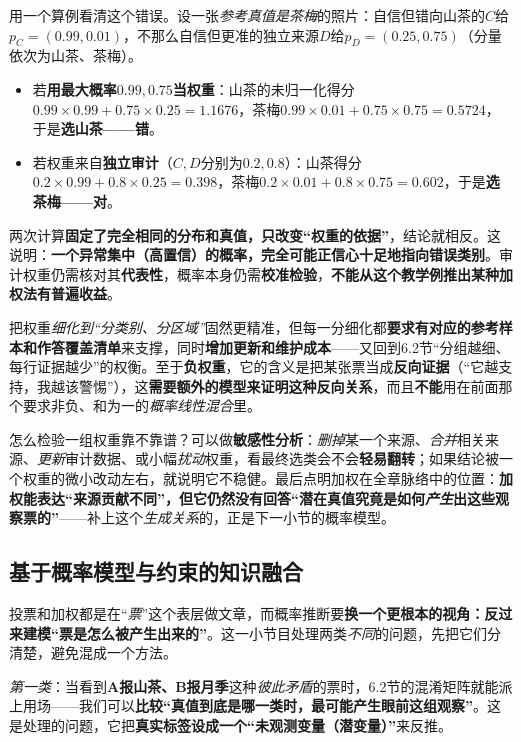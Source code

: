 用一个算例看清这个错误。设一张\emph{参考真值是茶梅}的照片：自信但错向山茶的$C$给$p_C=(0.99,0.01)$，不那么自信但更准的独立来源$D$给$p_D=(0.25,0.75)$（分量依次为山茶、茶梅）。
\begin{itemize}\item 若\textbf{用最大概率}$0.99,0.75$\textbf{当权重}：山茶的未归一化得分$0.99\times0.99+0.75\times0.25=1.1676$，茶梅$0.99\times0.01+0.75\times0.75=0.5724$，于是\textbf{选山茶——错}。\item 若权重来自\textbf{独立审计}（$C,D$分别为$0.2,0.8$）：山茶得分$0.2\times0.99+0.8\times0.25=0.398$，茶梅$0.2\times0.01+0.8\times0.75=0.602$，于是\textbf{选茶梅——对}。\end{itemize}
两次计算\textbf{固定了完全相同的分布和真值，只改变“权重的依据”}，结论就相反。这说明：\textbf{一个异常集中（高置信）的概率，完全可能正信心十足地指向错误类别}。审计权重仍需核对其\textbf{代表性}，概率本身仍需\textbf{校准检验}，\textbf{不能从这个教学例推出某种加权法有普遍收益}。

把权重\emph{细化到“分类别、分区域”}固然更精准，但每一分细化都\textbf{要求有对应的参考样本和作答覆盖清单}来支撑，同时\textbf{增加更新和维护成本}——又回到6.2节“分组越细、每行证据越少”的权衡。至于\textbf{负权重}，它的含义是把某张票当成\textbf{反向证据}（“它越支持，我越该警惕”），这\textbf{需要额外的模型来证明这种反向关系}，而且\textbf{不能}用在前面那个要求非负、和为一的\emph{概率线性混合}里。

怎么检验一组权重靠不靠谱？可以做\textbf{敏感性分析}：\emph{删掉}某一个来源、\emph{合并}相关来源、\emph{更新}审计数据、或小幅\emph{扰动}权重，看最终选类会不会\textbf{轻易翻转}；如果结论被一个权重的微小改动左右，就说明它不稳健。最后点明加权在全章脉络中的位置：\textbf{加权能表达“来源贡献不同”，但它仍然没有回答“潜在真值究竟是如何\emph{产生}出这些观察票的”}——补上这个\emph{生成关系}的，正是下一小节的概率模型。

\subsection{基于概率模型与约束的知识融合}
\label{sec:knowledge-fusion-probabilistic-constrained}

投票和加权都是在“\emph{票}”这个表层做文章，而概率推断要\textbf{换一个更根本的视角：反过来建模“票是怎么被产生出来的”}。这一小节目处理两类\emph{不同}的问题，先把它们分清楚，避免混成一个方法。

\emph{第一类}：当看到\textbf{A报山茶、B报月季}这种\emph{彼此矛盾}的票时，6.2节的混淆矩阵就能派上用场——我们可以\textbf{比较“真值到底是哪一类时，最可能产生眼前这组观察”}。这是处理的问题，它把\textbf{真实标签设成一个“未观测变量（潜变量）”}来反推。

